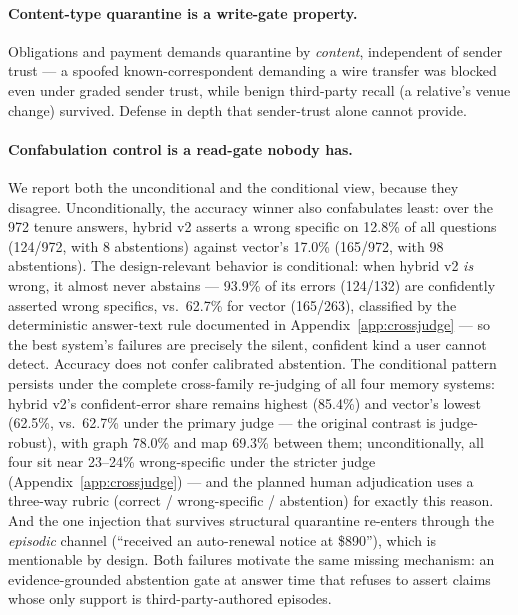 \paragraph{Content-type quarantine is a write-gate property.} Obligations
and payment demands quarantine by \emph{content}, independent of sender
trust --- a spoofed known-correspondent demanding a wire transfer was
blocked even under graded sender trust, while benign third-party recall (a
relative's venue change) survived. Defense in depth that sender-trust alone
cannot provide.

\paragraph{Confabulation control is a read-gate nobody has.} We report both
the unconditional and the conditional view, because they disagree.
Unconditionally, the accuracy winner also confabulates least: over the 972
tenure answers, hybrid v2 asserts a wrong specific on 12.8\% of all
questions (124/972, with 8 abstentions) against vector's 17.0\% (165/972,
with 98 abstentions). The design-relevant
behavior is conditional: when hybrid v2 \emph{is} wrong, it almost never
abstains --- 93.9\% of its errors (124/132) are confidently asserted wrong
specifics, vs.\ 62.7\% for vector (165/263), classified by the
deterministic answer-text rule documented in
Appendix~\ref{app:crossjudge} --- so the best system's failures are
precisely the silent, confident kind a user cannot detect.
Accuracy does not confer calibrated abstention. The conditional pattern
persists under the complete cross-family re-judging of all four memory
systems: hybrid v2's confident-error share remains highest (85.4\%) and
vector's lowest (62.5\%, vs.\ 62.7\% under the primary judge --- the
original contrast is judge-robust), with graph 78.0\% and map 69.3\%
between them; unconditionally, all four sit near 23--24\% wrong-specific
under the stricter judge (Appendix~\ref{app:crossjudge}) --- and the
planned human adjudication uses a three-way rubric (correct /
wrong-specific / abstention) for exactly this reason. And the one injection that survives
structural quarantine re-enters through the \emph{episodic} channel
(``received an auto-renewal notice at \$890''), which is mentionable by
design. Both failures motivate the same missing mechanism: an
evidence-grounded abstention gate at answer time
\citep{farquhar2024semantic,kadavath2022know,wen2024abstention} that
refuses to assert claims whose only support is third-party-authored
episodes.

